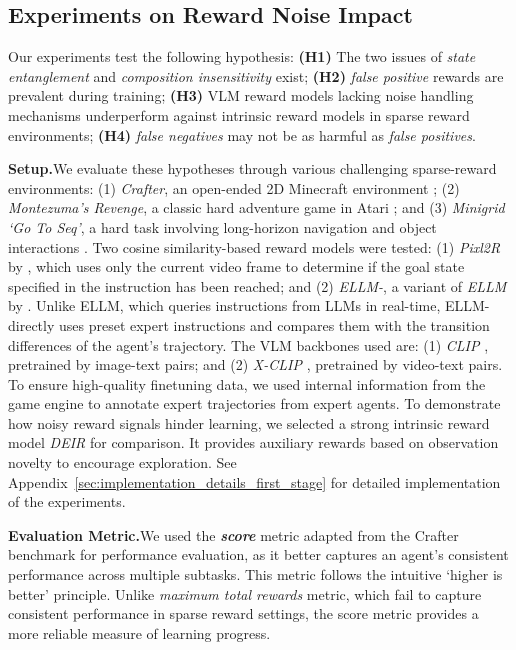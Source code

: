 \documentclass{article}
\theoremstyle{plain}
\theoremstyle{definition}
\theoremstyle{remark}
\begin{document}
\subsection{Experiments on Reward Noise Impact}
\label{sec:experiments_on_existence}
Our experiments test the following hypothesis: \textbf{(H1)} The two issues of \emph{state entanglement} and \emph{composition insensitivity} exist; \textbf{(H2)} \emph{false positive} rewards are prevalent during training; \textbf{(H3)} VLM reward models lacking noise handling mechanisms underperform against intrinsic reward models in sparse reward environments; \textbf{(H4)} \emph{false negatives} may not be as harmful as \emph{false positives}.

\noindent \textbf{Setup.}\quad We evaluate these hypotheses through various challenging sparse-reward environments: (1) \emph{Crafter}, an open-ended 2D Minecraft environment \citep{Hafner2021BenchmarkingTS}; (2) \emph{Montezuma's Revenge}, a classic hard adventure game in Atari \citep{Bellemare2012TheAL}; and (3) \emph{Minigrid `Go To Seq'}, a hard task involving long-horizon navigation and object interactions \citep{chevalier2018babyai}. Two cosine similarity-based reward models were tested: (1) \emph{Pixl2R} by \citet{Goyal2020PixL2RGR}, which uses only the current video frame to determine if the goal state specified in the instruction has been reached; and (2) \emph{ELLM-}, a variant of \emph{ELLM} by \citet{du2023guiding}. Unlike ELLM, which queries instructions from LLMs in real-time, ELLM- directly uses preset expert instructions and compares them with the transition differences of the agent's trajectory. The VLM backbones used are: (1) \emph{CLIP} \citep{Radford2021LearningTV}, pretrained by image-text pairs; and (2) \emph{X-CLIP} \citep{Ma2022XCLIPEM}, pretrained by video-text pairs. To ensure high-quality finetuning data, we used internal information from the game engine to annotate expert trajectories from expert agents. To demonstrate how noisy reward signals hinder learning, we selected a strong intrinsic reward model \emph{DEIR} \citep{Zhang2021NovelDAS} for comparison. It provides auxiliary rewards based on observation novelty to encourage exploration. See Appendix~\ref{sec:implementation_details_first_stage} for detailed implementation of the experiments.

\noindent \textbf{Evaluation Metric.}\quad We used the \textbf{\emph{score}} metric adapted from the Crafter benchmark \citep{Hafner2021BenchmarkingTS} for performance evaluation, as it better captures an agent's consistent performance across multiple subtasks. This metric follows the intuitive `higher is better' principle. Unlike \emph{maximum total rewards} metric, which fail to capture consistent performance in sparse reward settings, the score metric provides a more reliable measure of learning progress.
\end{document}
